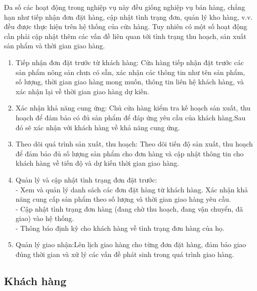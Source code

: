        Đa số các hoạt động trong nghiệp vụ này đều giống nghiệp vụ bán hàng, chẳng hạn như tiếp nhận đơn đặt hàng, cập nhật tình trạng đơn, quản lý kho hàng, v.v. đều được thực hiện trên hệ thống của cửa hàng. Tuy nhiên có một số hoạt động cần phải cập nhật thêm các vấn đề liên quan tới tình trạng thu hoạch, sản xuất sản phẩm và thời gian giao hàng.
        \begin{enumerate}
            \item Tiếp nhận đơn đặt trước từ khách hàng: Cửa hàng tiếp nhận đặt trước các sản phẩm nông sản chưa có sẵn, xác nhận các thông tin như tên sản phẩm, số lượng, thời gian giao hàng mong muốn, thông tin liên hệ khách hàng, và xác nhận lại về thời gian giao hàng dự kiến.
            \item Xác nhận khả năng cung ứng: Chủ cửa hàng kiểm tra kế hoạch sản xuất, thu hoạch để đảm bảo có đủ sản phẩm để đáp ứng yêu cầu của khách hàng.Sau đó sẽ xác nhận với khách hàng về khả năng cung ứng.
            \item Theo dõi quá trình sản xuất, thu hoạch: Theo dõi tiến độ sản xuất, thu hoạch để đảm bảo đủ số lượng sản phẩm cho đơn hàng và cập nhật thông tin cho khách hàng về tiến độ và dự kiến thời gian giao hàng.
            \item Quản lý và cập nhật tình trạng đơn đặt trước:\\
                - Xem và quản lý danh sách các đơn đặt hàng từ khách hàng. Xác nhận khả năng cung cấp sản phẩm theo số lượng và thời gian giao hàng yêu cầu.\\
                - Cập nhật tình trạng đơn hàng (đang chờ thu hoạch, đang vận chuyển, đã giao) vào hệ thống.\\
                - Thông báo định kỳ cho khách hàng về tình trạng đơn hàng của họ.
            \item Quản lý giao nhận:Lên lịch giao hàng cho từng đơn đặt hàng, đảm bảo giao đúng thời gian và xử lý các vấn đề phát sinh trong quá trình giao hàng.\\

        \end{enumerate}
    \newpage    
    \subsection{Khách hàng}
